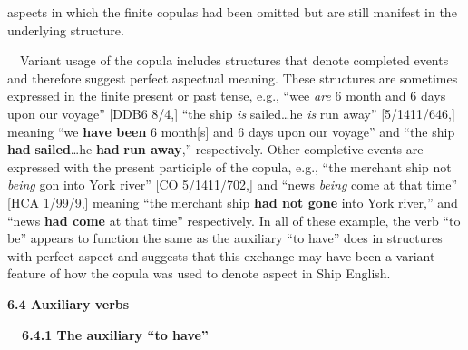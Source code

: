\begin{styleStandard}
aspects in which the finite copulas had been omitted but are still manifest in the underlying structure. 
\end{styleStandard}

\begin{styleStandard}
\ \ Variant usage of the copula includes structures that denote completed events and therefore suggest perfect aspectual meaning. These structures are sometimes expressed in the finite present or past tense, e.g., “wee\textit{ are} 6 month and 6 days upon our voyage” [DDB6 8/4,] “the ship \textit{is }sailed…he \textit{is} run away” [5/1411/646,] meaning “we \textbf{have been} 6 month[s] and 6 days upon our voyage” and “the ship \textbf{had}\textbf{\textit{ }}\textbf{sailed}…he \textbf{had} \textbf{run away},” respectively. Other completive events are expressed with the present participle of the copula, e.g., “the merchant ship not \textit{being} gon into York river” [CO 5/1411/702,] and “news \textit{being} come at that time” [HCA 1/99/9,] meaning “the merchant ship \textbf{had not gone} into York river,” and “news \textbf{had come} at that time” respectively. In all of these example, the verb “to be” appears to function the same as the auxiliary “to have” does in structures with perfect aspect and suggests that this exchange may have been a variant feature of how the copula was used to denote aspect in Ship English. 
\end{styleStandard}

\begin{styleStandard}
\textbf{6.4 Auxiliary verbs}
\end{styleStandard}

\begin{styleStandard}
\textbf{\ \ 6.4.1 The auxiliary “to have”}
\end{styleStandard}

